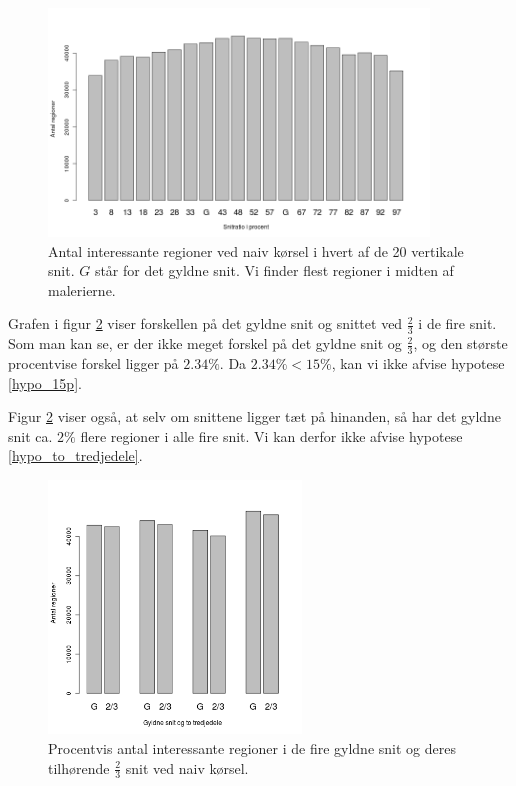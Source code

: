 {\begin{figure}[h!]
	\centering
	\includegraphics[width=0.9\textwidth]{afsnit/resultater/billeder/cut0cut1eatsperratio.png}
    \caption{Antal interessante regioner ved naiv kørsel i hvert af de
    20 vertikale snit. $G$ står for det gyldne snit. Vi finder flest
    regioner i midten af malerierne.}
	\label{antal_regioner_vertikale_cut}
\end{figure}

Grafen i figur \ref{G_vs_to_trejedele} viser forskellen på det gyldne
snit og snittet ved $\frac{2}{3}$ i de fire snit. Som man kan se, er der
ikke meget forskel på det gyldne snit og $\frac{2}{3}$, og den største
procentvise forskel ligger på $2.34\%$. Da $2.34 \% < 15\%$, kan vi ikke
afvise hypotese \ref{hypo_15p}.

Figur \ref{G_vs_to_trejedele} viser også, at selv om snittene ligger tæt
på hinanden, så har det gyldne snit ca. $2 \%$ flere regioner i alle
fire snit. Vi kan derfor ikke afvise hypotese \ref{hypo_to_tredjedele}.

\begin{figure}[h!]
	\centering
	\includegraphics[width=0.6\textwidth]{afsnit/resultater/billeder/G_vs_to_tredjedele.png}
    \caption{Procentvis antal interessante regioner i de fire gyldne
    snit og deres tilhørende $\frac{2}{3}$ snit ved naiv kørsel.}
	\label{G_vs_to_trejedele}
\end{figure}

}

